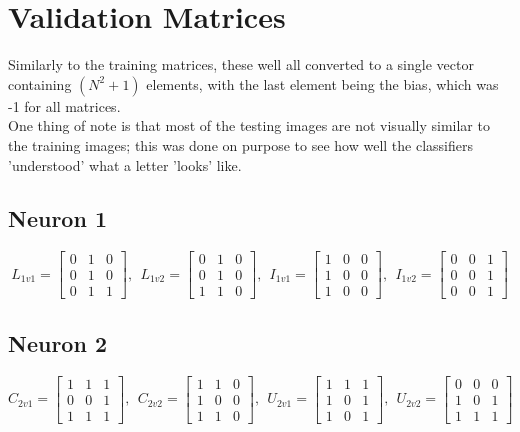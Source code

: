 \documentclass{article}
\begin{document}
\pagebreak
\section{Validation Matrices}\label{S6}
	Similarly to the training matrices, these well all converted to a single vector containing $(N^2 + 1)$ elements, with the last element being the bias, which was -1 for all matrices. \\ One thing of note is that most of the testing images are not visually similar to the training images; this was done on purpose to see how well the classifiers 'understood' what a letter 'looks' like. 
	\subsection{Neuron 1}
	\[
	L_{1v1} = 
	\begin{bmatrix}
	0 & 1 & 0 \\
	0 & 1 & 0 \\
	0 & 1 & 1
	\end{bmatrix}
	,~~L_{1v2} = 
	\begin{bmatrix}
	0 & 1 & 0 \\
	0 & 1 & 0 \\
	1 & 1 & 0
	\end{bmatrix}
	,~~I_{1v1} = 
	\begin{bmatrix}
	1 & 0 & 0 \\
	1 & 0 & 0 \\
	1 & 0 & 0
	\end{bmatrix}
	,~~I_{1v2} = 
	\begin{bmatrix}
	0 & 0 & 1 \\
	0 & 0 & 1 \\
	0 & 0 & 1
	\end{bmatrix}
	\]
	\subsection{Neuron 2}
	\[
	C_{2v1} = 
	\begin{bmatrix}
	1 & 1 & 1 \\
	0 & 0 & 1 \\
	1 & 1 & 1
	\end{bmatrix}
	,~~C_{2v2} = 
	\begin{bmatrix}
	1 & 1 & 0 \\
	1 & 0 & 0 \\
	1 & 1 & 0
	\end{bmatrix}
	,~~U_{2v1} = 
	\begin{bmatrix}
	1 & 1 & 1 \\
	1 & 0 & 1 \\
	1 & 0 & 1
	\end{bmatrix}
	,~~U_{2v2} = 
	\begin{bmatrix}
	0 & 0 & 0 \\
	1 & 0 & 1 \\
	1 & 1 & 1
	\end{bmatrix}
	\]
\end{document}
